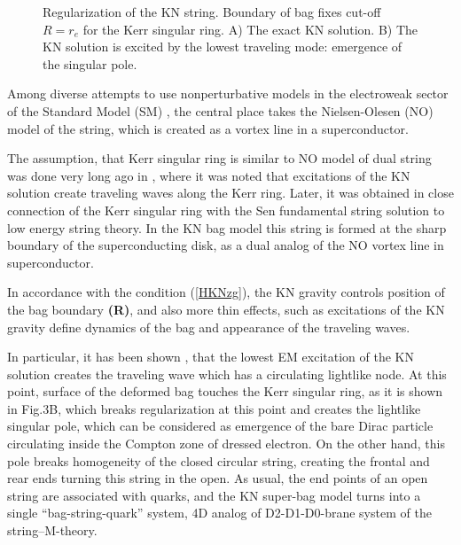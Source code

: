 \documentclass[aps,prd,twocolumn,showpacs]{revtex4}
\begin{document}
\begin{figure}[ht]
\centerline{} \caption{Regularization of the KN string.  Boundary of  bag fixes cut-off $R=r_e $ for the Kerr singular ring. A) The exact KN solution. B) The KN solution is excited by the lowest traveling mode: emergence of the singular pole.} \label{fig.7}
\end{figure}

Among diverse attempts to use nonperturbative models in the electroweak sector of the Standard
Model (SM) \cite{Colem,AchVach,Kus,Dval,Volk}, the central place takes the  Nielsen-Olesen (NO) model
\cite{NO,Amb} of the string, which is created as a vortex line in a superconductor.

 The assumption, that Kerr singular ring is similar to NO model of dual string was done very
 long ago in \cite{IvBur,Bur0}, where it was noted that excitations of the KN solution create traveling waves along
 the Kerr ring. Later, it was obtained  in \cite{BurSen,KerSen}  close connection of the Kerr singular ring
 with the Sen fundamental string solution to low energy string theory. In the  KN bag model this
 string is formed at the sharp boundary of the superconducting disk, as a dual analog of the NO vortex line in
 superconductor.

 In accordance with the condition (\ref{HKNzg}), the KN gravity  controls position
  of the bag boundary \textbf{(R)}, and also more thin effects, such as excitations of the KN gravity
   define dynamics of the bag and appearance of the traveling waves.

  In particular, it has been shown \cite{BurBag1}, that the lowest EM excitation of the KN solution
  creates the traveling wave which has a circulating lightlike node. At this point, surface of the deformed bag
  touches the Kerr singular ring, as it is shown in Fig.3B, which breaks
regularization at this point and creates the lightlike singular pole, which can be considered as
emergence of the bare Dirac particle circulating inside the Compton zone of dressed electron. On
the other hand, this pole breaks homogeneity of the closed circular string, creating the frontal
and rear ends turning this string in the open. As usual, the end points of an open  string are
associated with quarks, and the KN super-bag model turns into a single ``bag-string-quark'' system,
4D analog of D2-D1-D0-brane system of the string--M-theory.
\end{document}
